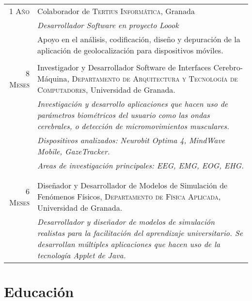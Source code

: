 \documentclass[a4paper,10pt]{article} %
\begin{document}
\begin{tabular}{r|p{11cm}}
\textsc{1 Año} & Colaborador de \textsc{Tertius Informática},
Granada \\
 & \emph{Desarrollador Software en proyecto Loook}\\
& \footnotesize{Apoyo en el análisis, codificación, diseño y depuración de la
aplicación de geolocalización para dispositivos móviles.}\\
\multicolumn{2}{c}{} \\



\textsc{8 Meses} & Investigador y Desarrollador Software de Interfaces
Cerebro-Máquina, \textsc{Departamento de Arquitectura y
Tecnología de Computadores}, Universidad de Granada. \\
& \emph{Investigación y desarrollo aplicaciones que hacen uso de parámetros
biométricos del usuario como las ondas cerebrales, o detección de
micromovimientos musculares.}
\\
& \emph{Dispositivos analizados: Neurobit Optima 4, MindWave Mobile,
GazeTracker.} \\
& \emph{Areas de investigación principales: EEG, EMG, EOG, EHG.}\\
& \footnotesize{}\\
\multicolumn{2}{c}{} \\


\textsc{6 Meses} & Diseñador y Desarrollador de Modelos de Simulación de
Fenómenos Físicos, \textsc{Departamento de Física Aplicada}, Universidad de
Granada. \\
& \emph{Desarrollador y diseñador de modelos de simulación realistas
para la facilitación del aprendizaje universitario. Se desarrollan múltiples
aplicaciones que hacen uso de la tecnología Applet de Java.}
\end{tabular}


\section{Educación}
\end{document}
